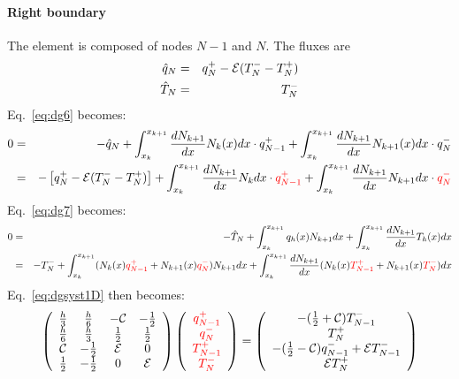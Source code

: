 \paragraph{Right boundary} The element is composed of nodes $N-1$ and $N$. The fluxes are 
\begin{eqnarray}
\hat{q}_N &=& q_N^+ -{\cal E} (T_N^--T_N^+) \nonumber  \\
\hat{T}_N &=& T_N^- \nonumber
\end{eqnarray}
Eq.~\eqref{eq:dg6} becomes:
\begin{eqnarray}
0 
&=& -\hat{q}_{N} 
+ \int_{x_k}^{x_{k+1}} \frac{dN_{k+1}}{dx} N_k(x) dx \cdot q_{N-1}^+ 
+ \int_{x_k}^{x_{k+1}} \frac{dN_{k+1}}{dx} N_{k+1}(x) dx \cdot q_{N}^- \nonumber\\ 
&=& - \left[ q_N^+ -{\cal E} (T_N^--T_N^+) \right] 
+ \int_{x_k}^{x_{k+1}} \frac{dN_{k+1}}{dx} N_k dx \cdot {\color{red}q_{N-1}^+} 
+ \int_{x_k}^{x_{k+1}} \frac{dN_{k+1}}{dx} N_{k+1}dx \cdot {\color{red}q_{N}^-} 
\end{eqnarray}
Eq.~\eqref{eq:dg7} becomes:
\begin{eqnarray}
0
&=& -\hat{T}_{N} 
+ \int_{x_k}^{x_{k+1}}  q_h(x) N_{k+1} dx
+ \int_{x_k}^{x_{k+1}} \frac{dN_{k+1} }{dx} T_h(x) dx  \nonumber\\
&=&-T_N^- + \int_{x_k}^{x_{k+1}} (N_k(x) {\color{red}q_{N-1}^+} + N_{k+1}(x) {\color{red}q_{N}^-})  N_{k+1} dx
+ \int_{x_k}^{x_{k+1}} \frac{dN_{k+1} }{dx} (N_k(x) {\color{red} T_{N-1}^+} + N_{k+1}(x) {\color{red}T_{N}^-}) dx
\nonumber 
\end{eqnarray}
Eq.~\eqref{eq:dgsyst1D} then becomes:
\begin{eqnarray}
\left(
\begin{array}{cccc}
\frac{h}{3}    &  \frac{h}{6} & -{\cal C}   &-\frac{1}{2} \\
\frac{h}{6}    &  \frac{h}{3} & \frac{1}{2} & \frac{1}{2} \\
{\cal C}    & -\frac{1}{2} & {\cal E} & 0\\
\frac{1}{2} & -\frac{1}{2} & 0 & {\cal E}
\end{array}
\right) \left(
\begin{array}{c}
     \color{red}{q_{N-1}^+}  \\
     \color{red}{q_{N}^-} \\
     \color{red}{T_{N-1}^+} \\
     \color{red}{T_{N}^-}
\end{array}
\right)=\left(
\begin{array}{cc}
     -(\frac{1}{2}+{\cal{C}}) T_{N-1}^-  \\
      T_{N}^+ \\
     -(\frac{1}{2}-{\cal{C}})q_{N-1}^-+{\cal{E}} T_{N-1}^-  \\
      {\cal{E}} T_{N}^+
\end{array}
\right)
\label{eq:dgsyst1Dright}
\end{eqnarray}


